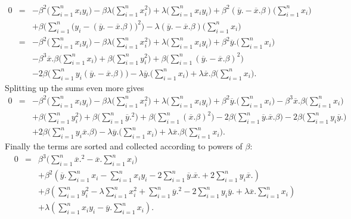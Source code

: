 \documentclass[a4paper,twoside,12pt]{article}
\begin{document}
\begin{eqnarray*}
0
&=&
-\beta^2\Big(\sum_{i=1}^nx_iy_i\Big)
-\beta\lambda\Big(\sum_{i=1}^nx_i^2\Big)
+\lambda\Big(\sum_{i=1}^nx_iy_i\Big)
+\beta^2(\overline{y}.-\overline{x}.\beta)\Big(\sum_{i=1}^nx_i\Big)\\[1em]
&&
+\beta\Big(\sum_{i=1}^n\big(y_i-(\overline{y}.-\overline{x}.\beta)\big)^2\Big)
-\lambda(\overline{y}.-\overline{x}.\beta)\Big(\sum_{i=1}^nx_i\Big)\\[1em]
&=&
-\beta^2\Big(\sum_{i=1}^nx_iy_i\Big)
-\beta\lambda\Big(\sum_{i=1}^nx_i^2\Big)
+\lambda\Big(\sum_{i=1}^nx_iy_i\Big)
+\beta^2\overline{y}.\Big(\sum_{i=1}^nx_i\Big)\\[1em]
&&
-\beta^3\overline{x}.\beta\Big(\sum_{i=1}^nx_i\Big)
+\beta\Big(\sum_{i=1}^ny_i^2\Big)
+\beta\Big(\sum_{i=1}^n\left(\overline{y}.-\overline{x}.\beta\right)^2\Big)\\[1em]
&&
-2\beta\Big(\sum_{i=1}^ny_i(\overline{y}.-\overline{x}.\beta)\Big)
-\lambda\overline{y}.\Big(\sum_{i=1}^nx_i\Big)
+\lambda\overline{x}.\beta\Big(\sum_{i=1}^nx_i\Big).
\end{eqnarray*}
Splitting up the sums even more gives
\begin{eqnarray*}
0
&=&
-\beta^2\Big(\sum_{i=1}^nx_iy_i\Big)
-\beta\lambda\Big(\sum_{i=1}^nx_i^2\Big)
+\lambda\Big(\sum_{i=1}^nx_iy_i\Big)
+\beta^2\overline{y}.\Big(\sum_{i=1}^nx_i\Big)
-\beta^3\overline{x}.\beta\Big(\sum_{i=1}^nx_i\Big)\\[1em]
&&
+\beta\Big(\sum_{i=1}^ny_i^2\Big)
+\beta\Big(\sum_{i=1}^n\overline{y}.^2\Big)
+\beta\Big(\sum_{i=1}^n\left(\overline{x}.\beta\right)^2\Big)
-2\beta\Big(\sum_{i=1}^n\overline{y}.\overline{x}.\beta\Big)
-2\beta\Big(\sum_{i=1}^ny_i\overline{y}.\Big)\\[1em]
&&
+2\beta\Big(\sum_{i=1}^ny_i\overline{x}.\beta\Big)
-\lambda\overline{y}.\Big(\sum_{i=1}^nx_i\Big)
+\lambda\overline{x}.\beta\Big(\sum_{i=1}^nx_i\Big).
\end{eqnarray*}
Finally the terms are sorted and collected according to powers of $\beta$:
\begin{eqnarray*}
0
&=&
\beta^3\Bigg(
\sum_{i=1}^n\overline{x}.^2
-\overline{x}.\sum_{i=1}^nx_i\Bigg)\\[1em]
&&
+\beta^2\left(
\overline{y}.\sum_{i=1}^nx_i
-\sum_{i=1}^nx_iy_i
-2\sum_{i=1}^n\overline{y}.\overline{x}.
+2\sum_{i=1}^ny_i\overline{x}.\right)\\[1em]
&&
+\beta\left(
\sum_{i=1}^ny_i^2
-\lambda\sum_{i=1}^nx_i^2
+\sum_{i=1}^n\overline{y}.^2
-2\sum_{i=1}^ny_i\overline{y}.
+\lambda\overline{x}.\sum_{i=1}^nx_i\right)\\[1em]
&&
+\lambda\left(
\sum_{i=1}^nx_iy_i
-\overline{y}.\sum_{i=1}^nx_i\right).
\end{eqnarray*}
\end{document}
